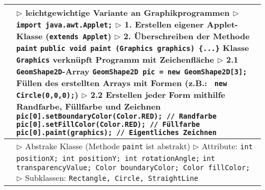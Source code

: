 	\begin{tabular}{ | p{4cm} p{13.5cm} | }
	\hline
	\makecell[l]{Applet} & \makecell[l]{$\rhd$ leichtgewichtige Variante an Graphikprogrammen \\
	$\rhd$ \texttt{import java.awt.Applet;} \\
	$\rhd$ 1. Erstellen eigener Applet-Klasse (\texttt{extends Applet}) \\
	$\rhd$ 2. Überschreiben der Methode \texttt{paint} \\
	\hspace{0.8cm} \texttt{public void paint (Graphics graphics) \{...\}} \\
	\hspace{0.8cm} Klasse \texttt{Graphics} verknüpft Programm mit Zeichenfläche \\
	$\rhd$ 2.1 \texttt{GeomShape2D}-Array \\
	\hspace{0.8cm} \texttt{GeomShape2D pic = new GeomShape2D[3];} \\
	\hspace{0.8cm} Füllen des erstellten Arrays mit Formen (z.B.: \texttt{ new Circle(0,0,0);})\\
	$\rhd$ 2.2 Erstellen jeder Form mithilfe Randfarbe, Füllfarbe und Zeichnen \\
	\hspace{0.8cm} \texttt{pic[0].setBoundaryColor(Color.RED); // Randfarbe} \\
	\hspace{0.8cm} \texttt{pic[0].setFillColor(Color.RED);	  // Füllfarbe} \\
	\hspace{0.8cm} \texttt{pic[0].paint(graphics); // Eigentliches Zeichnen}} \\ \hline
	
	\makecell[l]{GeomShape2D} & \makecell[l]{$\rhd$ Abstrake Klasse (Methode \texttt{paint} ist abstrakt) \\
	$\rhd$ Attribute: \\
	\hspace{0.4cm} \texttt{int positionX; int positionY; int rotationAngle;} \\
	\hspace{0.4cm} \texttt{int transparencyValue; Color boundaryColor; Color fillColor;} \\
	$\rhd$ Subklassen: \texttt{Rectangle, Circle, StraightLine} } \\ \hline
	\end{tabular}


